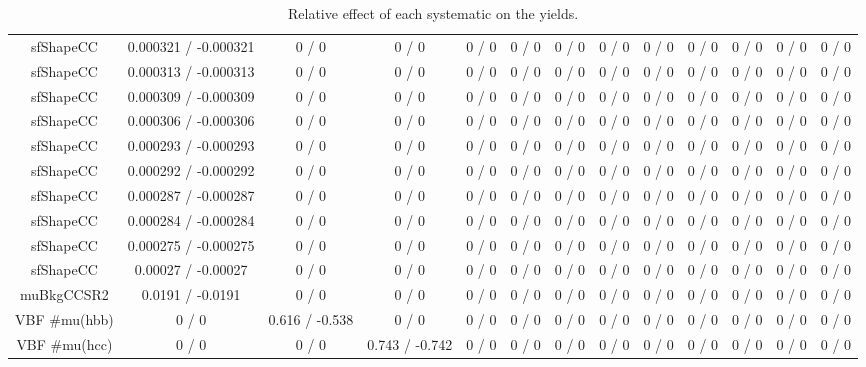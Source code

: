 \documentclass[10pt]{article}
\begin{document}
\begin{table}[htbp]
\begin{center}
\begin{tabular}{|c|c|c|c|c|c|c|c|c|c|c|c|c|}
  sfShapeCC & 0.000321 / -0.000321 & 0 / 0 & 0 / 0 & 0 / 0 & 0 / 0 & 0 / 0 & 0 / 0 & 0 / 0 & 0 / 0 & 0 / 0 & 0 / 0 & 0 / 0 \\ 
  sfShapeCC & 0.000313 / -0.000313 & 0 / 0 & 0 / 0 & 0 / 0 & 0 / 0 & 0 / 0 & 0 / 0 & 0 / 0 & 0 / 0 & 0 / 0 & 0 / 0 & 0 / 0 \\ 
  sfShapeCC & 0.000309 / -0.000309 & 0 / 0 & 0 / 0 & 0 / 0 & 0 / 0 & 0 / 0 & 0 / 0 & 0 / 0 & 0 / 0 & 0 / 0 & 0 / 0 & 0 / 0 \\ 
  sfShapeCC & 0.000306 / -0.000306 & 0 / 0 & 0 / 0 & 0 / 0 & 0 / 0 & 0 / 0 & 0 / 0 & 0 / 0 & 0 / 0 & 0 / 0 & 0 / 0 & 0 / 0 \\ 
  sfShapeCC & 0.000293 / -0.000293 & 0 / 0 & 0 / 0 & 0 / 0 & 0 / 0 & 0 / 0 & 0 / 0 & 0 / 0 & 0 / 0 & 0 / 0 & 0 / 0 & 0 / 0 \\ 
  sfShapeCC & 0.000292 / -0.000292 & 0 / 0 & 0 / 0 & 0 / 0 & 0 / 0 & 0 / 0 & 0 / 0 & 0 / 0 & 0 / 0 & 0 / 0 & 0 / 0 & 0 / 0 \\ 
  sfShapeCC & 0.000287 / -0.000287 & 0 / 0 & 0 / 0 & 0 / 0 & 0 / 0 & 0 / 0 & 0 / 0 & 0 / 0 & 0 / 0 & 0 / 0 & 0 / 0 & 0 / 0 \\ 
  sfShapeCC & 0.000284 / -0.000284 & 0 / 0 & 0 / 0 & 0 / 0 & 0 / 0 & 0 / 0 & 0 / 0 & 0 / 0 & 0 / 0 & 0 / 0 & 0 / 0 & 0 / 0 \\ 
  sfShapeCC & 0.000275 / -0.000275 & 0 / 0 & 0 / 0 & 0 / 0 & 0 / 0 & 0 / 0 & 0 / 0 & 0 / 0 & 0 / 0 & 0 / 0 & 0 / 0 & 0 / 0 \\ 
  sfShapeCC & 0.00027 / -0.00027 & 0 / 0 & 0 / 0 & 0 / 0 & 0 / 0 & 0 / 0 & 0 / 0 & 0 / 0 & 0 / 0 & 0 / 0 & 0 / 0 & 0 / 0 \\ 
  muBkgCCSR2 & 0.0191 / -0.0191 & 0 / 0 & 0 / 0 & 0 / 0 & 0 / 0 & 0 / 0 & 0 / 0 & 0 / 0 & 0 / 0 & 0 / 0 & 0 / 0 & 0 / 0 \\ 
  VBF #mu(hbb) & 0 / 0 & 0.616 / -0.538 & 0 / 0 & 0 / 0 & 0 / 0 & 0 / 0 & 0 / 0 & 0 / 0 & 0 / 0 & 0 / 0 & 0 / 0 & 0 / 0 \\ 
  VBF #mu(hcc) & 0 / 0 & 0 / 0 & 0.743 / -0.742 & 0 / 0 & 0 / 0 & 0 / 0 & 0 / 0 & 0 / 0 & 0 / 0 & 0 / 0 & 0 / 0 & 0 / 0 \\ 
\hline 
\end{tabular} 
\caption{Relative effect of each systematic on the yields.} 
\end{center} 
\end{table} 
\end{document}
